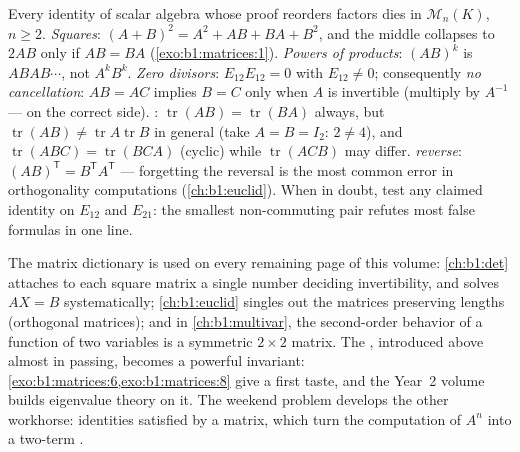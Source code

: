 \begin{remark}
\label{rem:b1:matrices:pitfalls}
Every identity of scalar algebra whose proof reorders factors
dies in $\mathcal{M}_n(K)$, $n \geq 2$.
\emph{Squares}: $(A + B)^2 = A^2 + AB + BA + B^2$, and the
middle collapses to $2AB$ only if $AB = BA$
(\cref{exo:b1:matrices:1}).
\emph{Powers of products}: $(AB)^k$ is $ABAB\cdots$, not
$A^kB^k$.
\emph{Zero divisors}: $E_{12}E_{12} = 0$ with $E_{12} \neq 0$;
consequently \emph{no cancellation}: $AB = AC$ implies $B = C$
only when $A$ is invertible (multiply by $A^{-1}$ --- on the
correct side).
\emph{}: $\operatorname{tr}(AB) = \operatorname{tr}(BA)$
always, but $\operatorname{tr}(AB) \neq
\operatorname{tr}A\operatorname{tr}B$ in general (take $A = B =
I_2$: $2 \neq 4$), and $\operatorname{tr}(ABC) =
\operatorname{tr}(BCA)$ (cyclic) while $\operatorname{tr}(ACB)$
may differ.
\emph{ reverse}: $(AB)^{\mathsf T} = B^{\mathsf
T}A^{\mathsf T}$ --- forgetting the reversal is the most common
error in orthogonality computations (\cref{ch:b1:euclid}).
When in doubt, test any claimed identity on $E_{12}$ and
$E_{21}$: the smallest non-commuting pair refutes most false
formulas in one line.
\end{remark}

\begin{remark}
\label{rem:b1:matrices:whereused}
The matrix dictionary is used on every remaining page of this
volume: \cref{ch:b1:det} attaches to each square matrix a single
number deciding invertibility, and solves $AX = B$
systematically; \cref{ch:b1:euclid} singles out the matrices
preserving lengths (orthogonal matrices); and in
\cref{ch:b1:multivar}, the second-order behavior of a function of
two variables is a symmetric $2 \times 2$ matrix. The ,
introduced above almost in passing, becomes a powerful invariant:
\cref{exo:b1:matrices:6,exo:b1:matrices:8} give a first taste,
and the Year~2 volume builds eigenvalue theory on it. The weekend
problem develops the other workhorse:  identities
satisfied by a matrix, which turn the computation of $A^n$ into
a two-term .
\end{remark}

